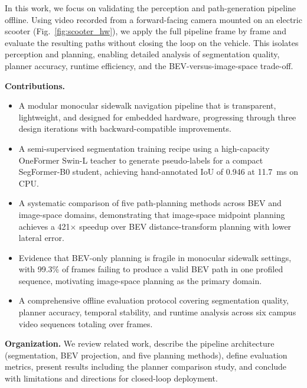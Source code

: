 \documentclass[a4paper,fleqn,10pt]{cas-dc}
\begin{document}
In this work, we focus on validating the perception and path-generation pipeline offline. Using video recorded from a forward-facing camera mounted on an electric scooter (Fig.~\ref{fig:scooter_hw}), we apply the full pipeline frame by frame and evaluate the resulting paths without closing the loop on the vehicle. This isolates perception and planning, enabling detailed analysis of segmentation quality, planner accuracy, runtime efficiency, and the BEV-versus-image-space trade-off.

\textbf{Contributions.}
\begin{itemize}[leftmargin=*,nosep]
  \item A modular monocular sidewalk navigation pipeline that is transparent, lightweight, and designed for embedded hardware, progressing through three design iterations with backward-compatible improvements.
  \item A semi-supervised segmentation training recipe using a high-capacity OneFormer Swin-L teacher to generate pseudo-labels for a compact SegFormer-B0 student, achieving hand-annotated IoU of 0.946 at \SI{11.7}{ms} on CPU.
  \item A systematic comparison of five path-planning methods across BEV and image-space domains, demonstrating that image-space midpoint planning achieves a 421$\times$ speedup over BEV distance-transform planning with lower lateral error.
  \item Evidence that BEV-only planning is fragile in monocular sidewalk settings, with 99.3\% of frames failing to produce a valid BEV path in one profiled sequence, motivating image-space planning as the primary domain.
  \item A comprehensive offline evaluation protocol covering segmentation quality, planner accuracy, temporal stability, and runtime analysis across six campus video sequences totaling over  frames.
\end{itemize}

\noindent\textbf{Organization.} We review related work, describe the pipeline architecture (segmentation, BEV projection, and five planning methods), define evaluation metrics, present results including the planner comparison study, and conclude with limitations and directions for closed-loop deployment.
\end{document}
